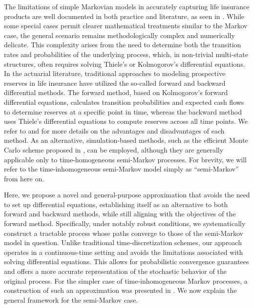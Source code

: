 \documentclass[11pt,leqno]{amsart}
\numberwithin{table}{section}
\numberwithin{figure}{section}
\numberwithin{equation}{section}
\newcommand{\1}{{\mathds{1}}}
\newcommand{\0}{\mat{0}}
\begin{document}
The limitations of simple Markovian models in accurately capturing life insurance products are well documented in both practice and literature, as seen in \cite{janssen1966application,hoem1972inhomogeneous,buchardt2015cash}. While some special cases permit clearer mathematical treatments similar to the Markov case, the general scenario remains methodologically complex and numerically delicate. This complexity arises from the need to determine both the transition rates and probabilities of the underlying process, which, in non-trivial multi-state structures, often requires solving Thiele's or Kolmogorov's differential equations. { In the actuarial literature, traditional approaches to modeling prospective reserves in life insurance have utilized the so-called forward and backward differential methods. The forward method, based on Kolmogorov’s forward differential equations, calculates transition probabilities and expected cash flows to determine reserves at a specific point in time, whereas the backward method uses Thiele’s differential equations to compute reserves across all time points. We refer to \cite[Section V.3]{asmussen2020risk} and \cite[Section 1.1]{furrer2020multi} for more details on the advantages and disadvantages of each method. As an alternative, simulation-based methods, such as the efficient Monte Carlo scheme proposed in \cite{fox1986discrete}, can be employed, although they are generally applicable only to time-homogeneous semi-Markov processes. For brevity, we will refer to the time-inhomogeneous semi-Markov model simply as ``semi-Markov'' from here on.}

{ Here, we propose a novel and general-purpose approximation that avoids the need to set up differential equations, establishing itself as an alternative to both forward and backward methods, while still aligning with the objectives of the forward method. Specifically, under notably robust conditions, we systematically construct a tractable process whose paths converge to those of the semi-Markov model in question. Unlike traditional time-discretization schemes, our approach operates in a continuous-time setting and avoids the limitations associated with solving differential equations. This allows for probabilistic convergence guarantees and offers a more accurate representation of the stochastic behavior of the original process. For the simpler case of time-inhomogeneous Markov processes, a construction of such an approximation was presented in \cite{bladt_peralta}. We now explain the general framework for the semi-Markov case.}
\end{document}
